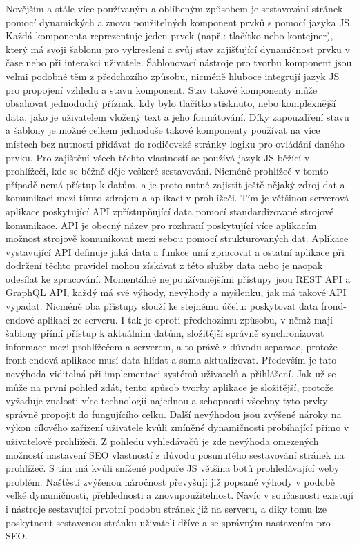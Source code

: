 	Novějším a stále více používaným a oblíbeným způsobem je sestavování stránek pomocí dynamických a znovu použitelných
	komponent prvků s pomocí jazyka \ac{JS}.
	Každá komponenta reprezentuje jeden prvek (např.: tlačítko nebo kontejner), který má svoji šablonu pro vykreslení
	a svůj stav zajišťující dynamičnost prvku v čase nebo při interakci uživatele.
	Šablonovací nástroje pro tvorbu komponent jsou velmi podobné těm z předchozího způsobu, nicméně hluboce integrují
	jazyk \ac{JS} pro propojení vzhledu a stavu komponent.
	Stav takové komponenty může obsahovat jednoduchý příznak, kdy bylo tlačítko stisknuto, nebo komplexnější
	data, jako je uživatelem vložený text a jeho formátování.
	Díky zapouzdření stavu a šablony je možné celkem jednoduše takové komponenty používat na více místech bez
	nutnosti přidávat do rodičovské stránky logiku pro ovládání daného prvku.
	Pro zajištění všech těchto vlastností se používá jazyk \ac{JS} běžící v prohlížeči, kde se běžně
	děje veškeré sestavování.
	Nicméně prohlížeč v tomto případě nemá přístup k datům, a je proto nutné zajistit ještě nějaký zdroj dat a komunikaci
	mezi tímto zdrojem a aplikací v prohlížeči.
	Tím je většinou serverová aplikace poskytující \ac{API} zpřístupňující data pomocí standardizované strojové komunikace.
	\ac{API} je obecný název pro rozhraní poskytující více aplikacím možnost strojově komunikovat mezi sebou pomocí
	strukturovaných dat.
	Aplikace vystavující \ac{API} definuje jaká data a funkce umí zpracovat a ostatní aplikace při dodržení těchto pravidel
	mohou získávat z této služby data nebo je naopak odesílat ke zpracování.
	Momentálně nejpoužívanějšími přístupy jsou \ac{REST} \ac{API} a GraphQL \ac{API}, každý má své výhody, nevýhody
	a myšlenku, jak má takové \ac{API} vypadat.
	Nicméně oba přístupy slouží ke stejnému účelu: poskytovat data frond-endové aplikaci ze serveru.
	I tak je oproti předchozímu způsobu, v němž mají šablony přímí přístup k aktuálním datům, složitější správně synchronizovat
	informace mezi prohlížečem a serverem, a to právě z důvodu separace, protože front-endová aplikace musí data
	hlídat a sama aktualizovat.
	Především je tato nevýhoda viditelná při implementaci systémů uživatelů a přihlášení.
	Jak už se může na první pohled zdát, tento způsob tvorby aplikace je složitější, protože vyžaduje znalosti více technologií
	najednou a schopnosti všechny tyto prvky správně propojit do fungujícího celku.
	Další nevýhodou jsou zvýšené nároky na výkon cílového zařízení uživatele kvůli zmíněné dynamičnosti probíhající přímo
	v uživatelově prohlížeči.
	Z pohledu vyhledávačů je zde nevýhoda omezených možností nastavení \ac{SEO} vlastností z důvodu posunutého sestavování
	stránek na prohlížeč.
	S tím má kvůli snížené podpoře \ac{JS} většina botů prohledávající weby problém.
	Naštěstí zvýšenou náročnost převyšují již popsané výhody v podobě velké dynamičnosti, přehlednosti a znovupoužitelnost.
	Navíc v současnosti existují i nástroje sestavující prvotní podobu stránek již na serveru, a díky tomu lze poskytnout sestavenou
	stránku uživateli dříve a se správným nastavením pro \ac{SEO}.

